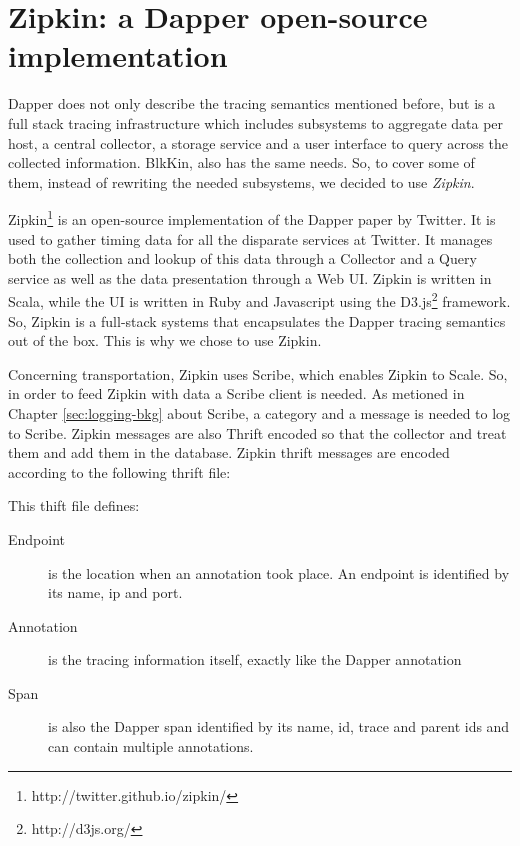 \section{Zipkin: a Dapper open-source implementation}\label{sec:zipkin}

Dapper does not only describe the tracing semantics mentioned before, but is a
full stack tracing infrastructure which includes subsystems to aggregate data
per host, a central collector, a storage service and a user interface to query
across the collected information. BlkKin, also has the same needs. So, to cover
some of them, instead of rewriting the needed subsystems, we decided to use
\textit{Zipkin}.

Zipkin\footnote{http://twitter.github.io/zipkin/} is an open-source
implementation of the Dapper paper by Twitter. It is used to gather timing data
for all the disparate services at Twitter. It manages both the collection and
lookup of this data through a Collector and a Query service as well as the data
presentation through a Web UI. Zipkin is written in Scala, while the UI is
written in Ruby and Javascript using the D3.js\footnote{http://d3js.org/}
framework. So, Zipkin is a full-stack systems that encapsulates the Dapper
tracing semantics out of the box. This is why we chose to use Zipkin.

Concerning transportation, Zipkin uses Scribe, which enables Zipkin to Scale.
So, in order to feed Zipkin with data a Scribe client is needed. As metioned in
Chapter \ref{sec:logging-bkg} about Scribe, a category and a message is needed
to log to Scribe. Zipkin messages are also Thrift encoded so that the collector
and treat them and add them in the database. Zipkin thrift messages are encoded
according to the following thrift file: 


This thift file defines:

\begin{description}
\item[Endpoint] is the location when an annotation took place. An endpoint is
identified by its name, ip and port.
\item[Annotation] is the tracing information itself, exactly like the Dapper
annotation
\item[Span] is also the Dapper span identified by its name, id, trace and parent
ids and can contain multiple annotations.
\end{description} 
